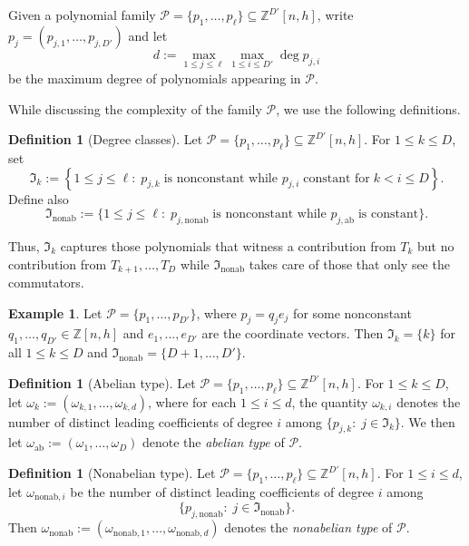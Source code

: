 \documentclass[11pt]{amsart}
\theoremstyle{definition}
\newtheorem{definition}[lemma]{Definition}
\newtheorem{example}[lemma]{Example}
\newcommand{\Z}{{\mathbb Z}}
\newcommand{\CP}{{\mathcal P}}
\newcommand{\FI}{{\mathfrak I}}
\newcommand{\1}{{\mathbf{1}}}
\newcommand{\ab}{{\mathrm{ab}}}
\newcommand{\nab}{{\mathrm{nonab}}}
\newcommand{\nonab}{{\mathrm{nonab}}}
\renewcommand{\top}{\mathrm{top}}
\newcommand{\rem}[1]{\left \{ #1 \right \}}
\newcommand{\BROWN}[1]{{\color{brown}{{#1}}}}
\begin{document}
Given a polynomial family $\CP = \{p_1, \ldots, p_\ell\}\subseteq \Z^{D'}[n,h]$,
write $p_{j}=(p_{j,1},\dots,p_{j,D'})$ 
and let $$d := \max_{1\leq j\leq \ell}\max_{1\leq i\leq D'}\deg p_{j,i}$$ be the maximum degree of polynomials appearing in $\CP$.

 


While discussing the complexity of the family $\CP$, we use the following definitions.
\begin{definition}[Degree classes]\label{D: degree classes}
    Let $\CP = \{p_1, \ldots, p_\ell\}\subseteq\Z^{D'}[n,h]$.
    For $1\leq k\leq D$, set
    $$\FI_k:=\rem{1\leq j\leq \ell\colon\; {p_{j,k}\; \textrm{is nonconstant while }} p_{j,i}\; \textrm{constant for}\; k<i\leq D}.$$
    Define also
    $$\FI_\nab :=\{1\leq j\leq \ell\colon\; {p_{j,\nonab}\; \textrm{is nonconstant while }} p_{j,\ab}\; \textrm{is constant}\}.$$
\end{definition}
Thus, $\FI_k$ captures those polynomials that witness {a contribution from $T_k$ but} no contribution from $T_{k+1}, \ldots, T_D$ %
while $\FI_\nab$ takes care of those that only see the commutators. 

\begin{example}
    Let $\CP = \{p_1, \ldots, p_{D'}\}$, where $p_j = q_je_j$ for some  nonconstant $q_1, \ldots, q_{D'}\in\Z[n,h]$ and $e_1, \ldots, e_{D'}$ are the coordinate vectors. Then 
    $\FI_k = \{k\}$ for all $1\leq k\leq D$ %
    and $\FI_\nab = \{D+1, \ldots, D'\}$.
\end{example}
\begin{definition}[Abelian type]
    Let $\CP = \{p_1, \ldots, p_\ell\}\subseteq\Z^{D'}[n,h]$.
    For $1\leq k\leq D$, let $\omega_{k} := (\omega_{k, 1}, \ldots, \omega_{k, d})$, where for each $1\leq i\leq d$, the quantity $\omega_{k,i}$ denotes the number of distinct leading coefficients of degree $i$ among $\{p_{j,k}\colon\; j\in\FI_k\}$. 
    We then let $\omega_\ab := (\omega_{1}, \ldots, \omega_{D})$ denote the \textit{abelian type} of $\CP$.
\end{definition}

\begin{definition}[Nonabelian type]
     Let $\CP = \{p_1, \ldots, p_\ell\}\subseteq\Z^{D'}[n,h]$. For $1\leq i\leq d$, let $\omega_{\nab, i}$ be the number of distinct leading coefficients of degree $i$ among $$\{p_{j,\nab}\colon\; j\in\FI_\nab\}.$$ Then $\omega_{\nab} := (\omega_{\nab, 1}, \ldots, \omega_{\nab, d})$ denotes the \textit{nonabelian type} of $\CP$.
\end{definition}
\end{document}
